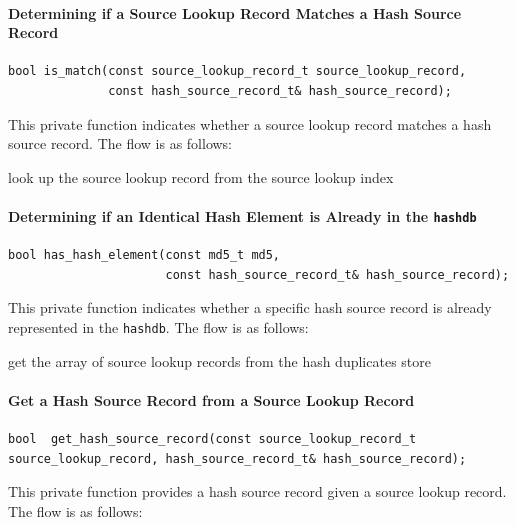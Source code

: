 \documentclass[10pt,twoside]{article}
\newcommand{\hdb}{\texttt{hashdb}\xspace}
\begin{document}
\paragraph{Determining if a Source Lookup Record Matches a Hash Source Record}
\begin{small}
\begin{verbatim}
bool is_match(const source_lookup_record_t source_lookup_record,
              const hash_source_record_t& hash_source_record);
\end{verbatim}
\end{small}
This private function indicates whether a source lookup record
matches a hash source record.
The flow is as follows:

\begin{algorithmic}
  \RETURN \FALSE
\ENDIF
\STATE look up the source lookup record from the source lookup index
  \RETURN \TRUE
\ELSE
  \RETURN \FALSE
\ENDIF
\end{algorithmic}

\paragraph{Determining if an Identical Hash Element is Already in the \hdb}
\begin{small}
\begin{verbatim}
bool has_hash_element(const md5_t md5,
                      const hash_source_record_t& hash_source_record);
\end{verbatim}
\end{small}
This private function indicates whether a specific hash source record
is already represented in the \hdb.
The flow is as follows:

\begin{algorithmic}
  \RETURN \FALSE
\ENDIF
{}
    \RETURN \TRUE
  \ELSE
    \RETURN \FALSE
  \ENDIF
\ELSE
  \STATE get the array of source lookup records from the hash duplicates store
      \RETURN \TRUE
    \ENDIF
  \ENDFOR
  \RETURN \FALSE
\ENDIF
\end{algorithmic}

\paragraph{Get a Hash Source Record from a Source Lookup Record}
\begin{small}
\begin{verbatim}
bool  get_hash_source_record(const source_lookup_record_t source_lookup_record, hash_source_record_t& hash_source_record);
\end{verbatim}
\end{small}
This private function provides a hash source record
given a source lookup record.
The flow is as follows:
\end{document}
